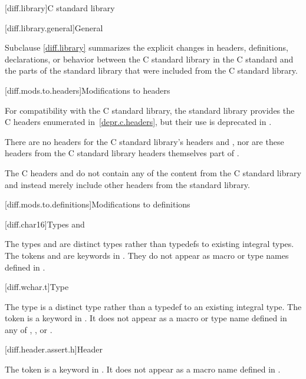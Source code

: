 [diff.library]{C standard library}

[diff.library.general]{General}
%

\pnum
Subclause \ref{diff.library} summarizes the explicit changes in headers,
definitions, declarations, or behavior between the C standard library
in the C standard and the parts of the \Cpp{} standard library that were
included from the C standard library.

[diff.mods.to.headers]{Modifications to headers}

\pnum
For compatibility with the C standard library,
the \Cpp{} standard library provides the C headers enumerated
in~\ref{depr.c.headers}, but their use is deprecated in \Cpp{}.

\pnum
There are no \Cpp{} headers for the C standard library's headers
 and ,
nor are these headers from the C standard library headers themselves part of \Cpp{}.

\pnum
The C headers  and
 do not contain any of the content from
the C standard library and instead merely include other headers from the \Cpp{}
standard library.

[diff.mods.to.definitions]{Modifications to definitions}

[diff.char16]{Types  and }

\pnum
The types  and 
are distinct types rather than typedefs to existing integral types.
The tokens  and 
are keywords in \Cpp{}.
They do not appear as macro or type names defined in
.

[diff.wchar.t]{Type }

\pnum
The type  is a distinct type rather than a typedef to an
existing integral type.
The token 
is a keyword in \Cpp{}.
It does not appear as a macro or type name defined in any of
,
,
or .

[diff.header.assert.h]{Header }
%

\pnum
The token  is a keyword in \Cpp{}.
It does not appear as a macro name defined
in .

